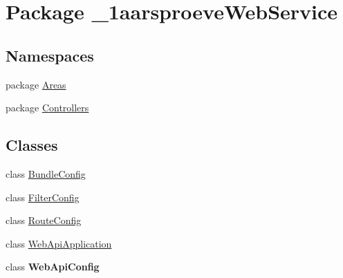 \hypertarget{namespace__1aarsproeve_web_service}{}\section{Package \+\_\+1aarsproeve\+Web\+Service}
\label{namespace__1aarsproeve_web_service}
\subsection*{Namespaces}
\begin{DoxyCompactItemize}
\item 
package \hyperlink{namespace__1aarsproeve_web_service_1_1_areas}{Areas}
\item 
package \hyperlink{namespace__1aarsproeve_web_service_1_1_controllers}{Controllers}
\end{DoxyCompactItemize}
\subsection*{Classes}
\begin{DoxyCompactItemize}
\item 
class \hyperlink{class__1aarsproeve_web_service_1_1_bundle_config}{Bundle\+Config}
\item 
class \hyperlink{class__1aarsproeve_web_service_1_1_filter_config}{Filter\+Config}
\item 
class \hyperlink{class__1aarsproeve_web_service_1_1_route_config}{Route\+Config}
\item 
class \hyperlink{class__1aarsproeve_web_service_1_1_web_api_application}{Web\+Api\+Application}
\item 
class {\bfseries Web\+Api\+Config}
\end{DoxyCompactItemize}
